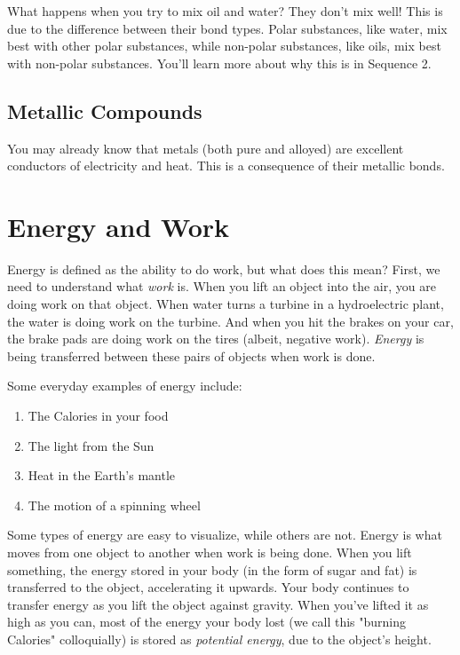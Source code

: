 What happens when you try to mix oil and water? They don't mix well! This is due 
to the difference between their bond types. Polar substances, like water, mix best
with other polar substances, while non-polar substances, like oils, mix best with 
non-polar substances. You'll learn more about why this is in Sequence 2.

\subsection{Metallic Compounds}
You may already know that metals (both pure and alloyed) are excellent conductors of electricity and heat. This is a consequence of their metallic bonds. 



\section{Energy and Work}

Energy is defined as the ability to do work, but what does this mean? First, we 
need to understand what \textit{work} is. When you lift an object into the air, 
you are doing work on that object. When water turns a turbine in a hydroelectric 
plant, the water is doing work on the turbine. And when you hit the brakes on your
car, the brake pads are doing work on the tires (albeit, negative work). 
\textit{Energy} is being transferred between these pairs of objects when work is 
done. 

Some everyday examples of energy include:
\begin{enumerate}
\item The Calories in your food
\item The light from the Sun
\item Heat in the Earth's mantle
\item The motion of a spinning wheel
\end{enumerate}

Some types of energy are easy to visualize, while others are not. Energy is what 
moves from one object to another when work is being done. When you lift 
something, the energy stored in your body (in the form of sugar and fat) is 
transferred to the object, accelerating it upwards. Your body continues to 
transfer energy as you lift the object against gravity. When you've lifted it as 
high as you can, most of the energy your body lost (we call this "burning 
Calories" colloquially) is stored as \textit{potential energy}, due to the 
object's height. 

